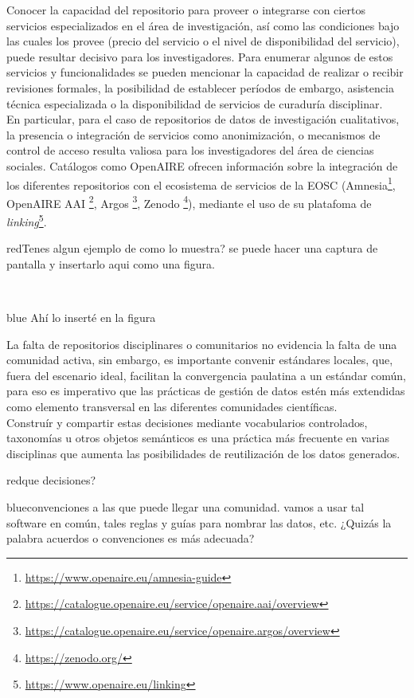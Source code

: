 \documentclass[runningheads]{llncs}
\def \bchregi {\begin{color}{red}}
\def \echregi {\end{color}}
\def \bchgon {\begin{color}{blue}}
\def \echgon {\end{color}}
\begin{document}
Conocer la capacidad del repositorio para proveer o integrarse con ciertos servicios especializados en el área de investigación, así como las condiciones bajo las cuales los provee (precio del servicio o el nivel de disponibilidad del servicio), puede resultar decisivo para los investigadores.  
Para enumerar algunos de estos servicios y funcionalidades se pueden mencionar la capacidad de realizar o recibir revisiones formales, la posibilidad de establecer períodos de embargo, asistencia técnica especializada o la disponibilidad de servicios de curaduría disciplinar.\\
En particular, para el caso de repositorios de datos de investigación cualitativos, la presencia o integración de servicios como anonimización, o mecanismos de control de acceso resulta valiosa para los investigadores del área de ciencias sociales. 
Catálogos como OpenAIRE ofrecen información sobre la integración de los diferentes repositorios con el ecosistema de servicios de la EOSC (Amnesia\footnote{\url{https://www.openaire.eu/amnesia-guide}}, OpenAIRE AAI \footnote{\url{https://catalogue.openaire.eu/service/openaire.aai/overview}}, Argos \footnote{\url{https://catalogue.openaire.eu/service/openaire.argos/overview}}, Zenodo \footnote{\url{https://zenodo.org/}}), mediante el uso de su platafoma de \textit{linking}\footnote{\url{https://www.openaire.eu/linking}}.\\
\bchregi Tenes algun ejemplo de como lo muestra? se puede hacer una captura de pantalla y insertarlo aqui como una figura.
\echregi \\
\bchgon
Ahí lo inserté en la figura %
\\
\echgon

La falta de repositorios disciplinares o comunitarios no evidencia la falta de una comunidad activa, sin embargo, es importante convenir estándares locales, que, fuera del escenario ideal, facilitan la convergencia paulatina a un estándar común, para eso es imperativo que las prácticas de gestión de datos estén más extendidas como elemento transversal en las diferentes comunidades científicas.\\
Construír y compartir estas decisiones mediante vocabularios controlados, taxonomías u otros objetos semánticos es una práctica más frecuente en varias disciplinas que aumenta las posibilidades de reutilización de los datos generados.\\
\bchregi que decisiones? \echregi
\bchgon convenciones a las que puede llegar una comunidad. vamos a usar tal software en común, tales reglas y guías para nombrar las datos, etc. ¿Quizás la palabra acuerdos o convenciones es más adecuada? \echgon
\end{document}
